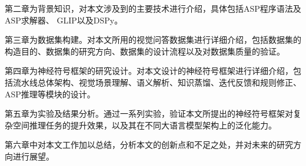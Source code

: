 第二章为背景知识，对本文涉及到的主要技术进行介绍，具体包括ASP程序语法及ASP求解器、
GLIP以及DSPy。

第三章为数据集构建。对本文所用的视觉问答数据集进行详细介绍，包括数据集的构造目的、数据集的研究方向、数据集的设计流程以及对数据集质量的验证。

第四章为神经符号框架的研究设计。对本文设计的神经符号框架进行详细介绍，包括流水线总体架构、视觉场景理解、语义解析、知识蒸馏、迭代反馈和规则修正、ASP推理等模块的设计。

第五章为实验及结果分析。通过一系列实验，验证本文所提出的神经符号框架对复杂空间推理任务的提升效果，以及其在不同大语言模型架构上的泛化能力。

第六章中对本文工作加以总结，分析本文的创新点和不足之处，并对未来的研究方向进行展望。
